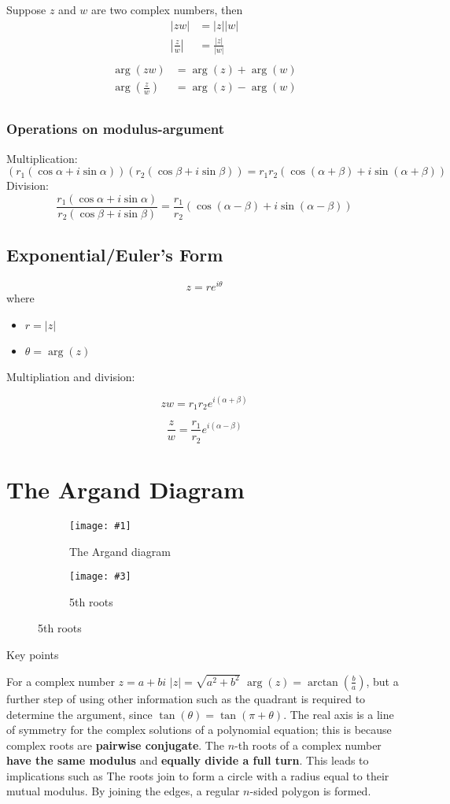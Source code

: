 \documentclass[11pt]{article}
\newcommand{\doubleimg}[4]{\begin{center}
  \begin{figure}[H]
    \centering
    \begin{subfigure}{.45\textwidth}
      \centering
      \texttt{[image: \#1]}
      \caption{#2}
      \label{fig:sub1}
    \end{subfigure}
    \begin{subfigure}{.45\textwidth}
      \centering
      \texttt{[image: \#3]}
      \caption{#4}
      \label{fig:sub2}
    \end{subfigure}
  \end{figure}
\end{center}}
\begin{document}
Suppose $z$ and $w$ are two complex numbers, then
\begin{align*}
  |zw|          & = |z||w|          \\
  |\frac{z}{w}| & = \frac{|z|}{|w|} \\
\end{align*}
\begin{align*}
  \arg(zw)          & = \arg(z) + \arg(w) \\
  \arg(\frac{z}{w}) & = \arg(z) - \arg(w) \\
\end{align*}

\subsubsection*{Operations on modulus-argument}
Multiplication:
$$\left(r_1(\cos \alpha + i\sin\alpha)\right)\left(r_2(\cos \beta + i\sin\beta)\right) = r_1r_2\left(\cos(\alpha + \beta) + i\sin(\alpha + \beta)\right)$$
Division:
$$\frac{r_1\left(\cos\alpha + i\sin\alpha\right)}{r_2\left(\cos \beta + i\sin\beta\right)} = \frac{r_1}{r_2}\left(\cos(\alpha - \beta) + i\sin(\alpha - \beta)\right)$$

\pagebreak

\subsection{Exponential/Euler's Form}

$$z = re^{i\theta}$$
where
\begin{itemize}
  \item $r = |z|$
  \item $\theta = \arg(z)$
\end{itemize}

\noindent Multipliation and division:

$$zw = r_1r_2e^{i(\alpha + \beta)}$$

$$\frac{z}{w} = \frac{r_1}{r_2}e^{i(\alpha - \beta)}$$

\pagebreak

\section{The Argand Diagram}

\doubleimg{figs/1.png}{The Argand diagram}{figs/roots.jpeg}{5th roots}

\noindent Key points
\begin{outline}[enumerate]
  \1 For a complex number $z = a + bi$
  \2 $|z| = \sqrt{a^2 + b^2}$
  \2 $\arg(z) = \arctan(\frac{b}{a})$, but a further step of using other information such as the quadrant is required to determine the argument, since $\tan(\theta) = \tan(\pi + \theta)$.
  \1 The real axis is a line of symmetry for the complex solutions of a polynomial equation; this is because complex roots are \textbf{pairwise conjugate}.
  \1 The $n$-th roots of a complex number \textbf{have the same modulus} and \textbf{equally divide a full turn}. This leads to implications such as
  \2 The roots join to form a circle with a radius equal to their mutual modulus.
  \2 By joining the edges, a regular $n$-sided polygon is formed.
\end{outline}
\end{document}

